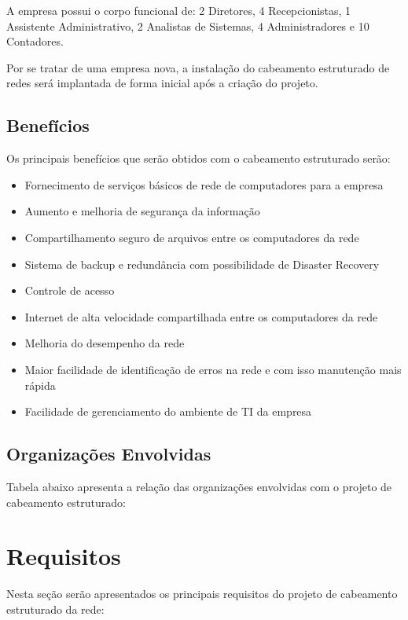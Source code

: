 \documentclass[	DIV=calc,%
							paper=a4,%
							fontsize=12pt,%
							onecolumn]{scrartcl}	 					%
\begin{document}
A empresa possui o corpo funcional de: 2 Diretores, 4 Recepcionistas, 1 Assistente Administrativo, 2 Analistas de Sistemas, 4 Administradores e 10 Contadores.

Por se tratar de uma empresa nova, a instalação do cabeamento estruturado de redes será implantada de forma inicial após a criação do projeto.

\subsection{Benefícios}
Os principais benefícios que serão obtidos com o cabeamento estruturado serão:
\begin{itemize}
\item Fornecimento de serviços básicos de rede de computadores para a empresa
\item Aumento e melhoria de segurança da informação
\item Compartilhamento seguro de arquivos entre os computadores da rede
\item Sistema de backup e redundância com possibilidade de Disaster Recovery
\item Controle de acesso
\item Internet de alta velocidade compartilhada entre os computadores da rede
\item Melhoria do desempenho da rede
\item Maior facilidade de identificação de erros na rede e com isso manutenção mais rápida
\item Facilidade de gerenciamento do ambiente de TI da empresa
\end{itemize}
	
\subsection{Organizações Envolvidas}
Tabela abaixo apresenta a relação das organizações envolvidas com o projeto de cabeamento estruturado:



\section{Requisitos}

Nesta seção serão apresentados os principais requisitos do projeto de cabeamento estruturado da rede:	
\end{document}
